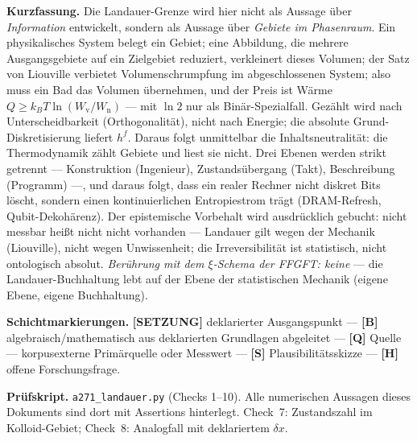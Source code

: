 
\providecommand{\qedsq}{\raisebox{0.03em}{\framebox[0.62em]{\rule{0pt}{0.42em}}}}
\begingroup\small\noindent
\textbf{Kurzfassung.} Die Landauer-Grenze wird hier nicht als Aussage über
\emph{Information} entwickelt, sondern als Aussage über \emph{Gebiete im
Phasenraum}. Ein physikalisches System belegt ein Gebiet; eine Abbildung, die
mehrere Ausgangsgebiete auf ein Zielgebiet reduziert, verkleinert dieses
Volumen; der Satz von Liouville verbietet Volumenschrumpfung im abgeschlossenen
System; also muss ein Bad das Volumen übernehmen, und der Preis ist Wärme
$Q \ge k_B T \ln(W_{\text{v}}/W_{\text{n}})$ --- mit $\ln 2$ nur als
Binär-Spezialfall. Gezählt wird nach Unterscheidbarkeit (Orthogonalität), nicht
nach Energie; die absolute Grund-Diskretisierung liefert $h^f$. Daraus folgt
unmittelbar die Inhaltsneutralität: die Thermodynamik zählt Gebiete und liest
sie nicht. Drei Ebenen werden strikt getrennt --- Konstruktion (Ingenieur),
Zustandsübergang (Takt), Beschreibung (Programm) ---, und daraus folgt, dass ein
realer Rechner nicht diskret Bits löscht, sondern einen kontinuierlichen
Entropiestrom trägt (DRAM-Refresh, Qubit-Dekohärenz). Der epistemische Vorbehalt
wird ausdrücklich gebucht: nicht messbar heißt nicht nicht vorhanden --- Landauer
gilt wegen der Mechanik (Liouville), nicht wegen Unwissenheit; die
Irreversibilität ist statistisch, nicht ontologisch absolut. \emph{Berührung mit
dem $\xi$-Schema der FFGFT: keine} --- die Landauer-Buchhaltung lebt auf der
Ebene der statistischen Mechanik (eigene Ebene, eigene Buchhaltung).
\par\endgroup

\bigskip

\begingroup\small\noindent
\textbf{Schichtmarkierungen.} \textbf{[SETZUNG]} deklarierter Ausgangspunkt ---
\textbf{[B]} algebraisch/mathematisch aus deklarierten Grundlagen abgeleitet ---
\textbf{[Q]} Quelle --- korpusexterne Primärquelle oder Messwert ---
\textbf{[S]} Plausibilitätsskizze ---
\textbf{[H]} offene Forschungsfrage.

\par\endgroup

\bigskip

\begingroup\small\noindent
\textbf{Prüfskript.} \texttt{a271\_landauer.py} (Checks 1--10). Alle
numerischen Aussagen dieses Dokuments sind dort mit Assertions hinterlegt.
Check~7: Zustandszahl im Kolloid-Gebiet; Check~8: Analogfall mit deklariertem
$\delta x$.
\par\endgroup

